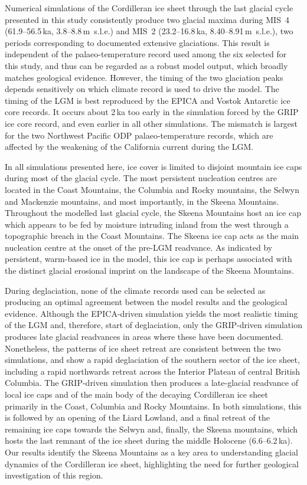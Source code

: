 \documentclass[tc]{copernicus}
\begin{document}
Numerical simulations of the Cordilleran ice sheet through the last glacial
cycle presented in this study consistently produce two glacial maxima during
MIS~4 (61.9--56.5\,ka, 3.8--8.8\,m~s.l.e.) and MIS~2 (23.2--16.8\,ka,
8.40--8.91\,m~s.l.e.), two periods corresponding to documented extensive
glaciations. This result is independent of the palaeo-temperature record used
among the six selected for this study, and thus can be regarded as a robust model
output, which broadly matches geological evidence. However, the timing of the
two glaciation peaks depends sensitively on which climate record is used to
drive the model. The timing of the LGM is best reproduced by the EPICA and
Vostok Antarctic ice core records. It occurs about 2\,ka too early in the
simulation forced by the GRIP ice core record, and even earlier in all other
simulations. The mismatch is largest for the two Northwest Pacific ODP
palaeo-temperature records, which are affected by the weakening of the
California current during the LGM.

In all simulations presented here, ice cover is limited to disjoint mountain
ice caps during most of the glacial cycle. The most persistent nucleation
centres are located in the Coast Mountains, the Columbia and Rocky mountains,
the Selwyn and Mackenzie mountains, and most importantly, in the Skeena
Mountains. Throughout the modelled last glacial cycle, the Skeena Mountains
host an ice cap which appears to be fed by moisture intruding inland from the
west through a topographic breach in the Coast Mountains. The Skeena ice cap acts
as the main nucleation centre at the onset of the pre-LGM readvance. As indicated
by persistent, warm-based ice in the model, this ice cap is perhaps associated
with the distinct glacial erosional imprint on the landscape of the Skeena
Mountains.

During deglaciation, none of the climate records used can be selected as
producing an optimal agreement between the model results and the geological
evidence. Although the EPICA-driven simulation yields the most realistic timing
of the LGM and, therefore, start of deglaciation, only the GRIP-driven
simulation produces late glacial readvances in areas where these have been
documented. Nonetheless, the patterns of ice sheet retreat are consistent
between the two simulations, and show a rapid deglaciation of the southern
sector of the ice sheet, including a rapid northwards retreat across the Interior
Plateau of central British Columbia. The GRIP-driven simulation then produces a
late-glacial readvance of local ice caps and of the main body of the decaying
Cordilleran ice sheet primarily in the Coast, Columbia and Rocky Mountains.
In both simulations, this is followed by an
opening of the Liard Lowland, and a final retreat of the remaining ice caps
towards the Selwyn and, finally, the Skeena mountains, which hosts the last
remnant of the ice sheet during the middle Holocene (6.6--6.2\,ka). Our results
identify the Skeena Mountains as a key area to understanding glacial dynamics
of the Cordilleran ice sheet, highlighting the need for further geological
investigation of this region.
\end{document}
